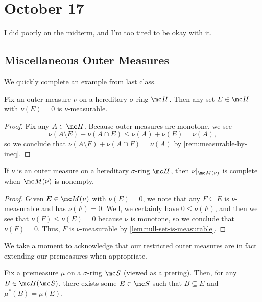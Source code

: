 \documentclass[../notes.tex]{subfiles}
\begin{document}
\section{October 17}

I did poorly on the midterm, and I'm too tired to be okay with it.

\subsection{Miscellaneous Outer Measures}
We quickly complete an example from last class.
\begin{lemma} \label{lem:null-set-is-measurable}
	Fix an outer measure $\nu$ on a hereditary $\sigma$-ring $\mc H$. Then any set $E\in\mc H$ with $\nu(E)=0$ is $\nu$-measurable.
\end{lemma}
\begin{proof}
	Fix any $A\in\mc H$. Because outer measures are monotone, we see
	\[\nu(A\setminus E)+\nu(A\cap E)\le\nu(A)+\nu(E)=\nu(A),\]
	so we conclude that $\nu(A\setminus F)+\nu(A\cap F)=\nu(A)$ by \autoref{rem:measurable-by-ineq}.
\end{proof}
\begin{lemma}
	If $\nu$ is an outer measure on a hereditary $\sigma$-ring $\mc H$, then $\nu|_{\mc M(\nu)}$ is complete when $\mc M(\nu)$ is nonempty.
\end{lemma}
\begin{proof}
	Given $E\in\mc M(\nu)$ with $\nu(E)=0$, we note that any $F\subseteq E$ is $\nu$-measurable and has $\nu(F)=0$. Well, we certainly have $0\le\nu(F)$, and then we see that $\nu(F)\le\nu(E)=0$ because $\nu$ is monotone, so we conclude that $\nu(F)=0$. Thus, $F$ is $\nu$-measurable by \autoref{lem:null-set-is-measurable}.
\end{proof}
We take a moment to acknowledge that our restricted outer measures are in fact extending our premeasures when appropriate.
\begin{lemma}
	Fix a premeasure $\mu$ on a $\sigma$-ring $\mc S$ (viewed as a prering). Then, for any $B\in\mc H(\mc S)$, there exists some $E\in\mc S$ such that $B\subseteq E$ and $\mu^*(B)=\mu(E)$.
\end{lemma}
\end{document}
